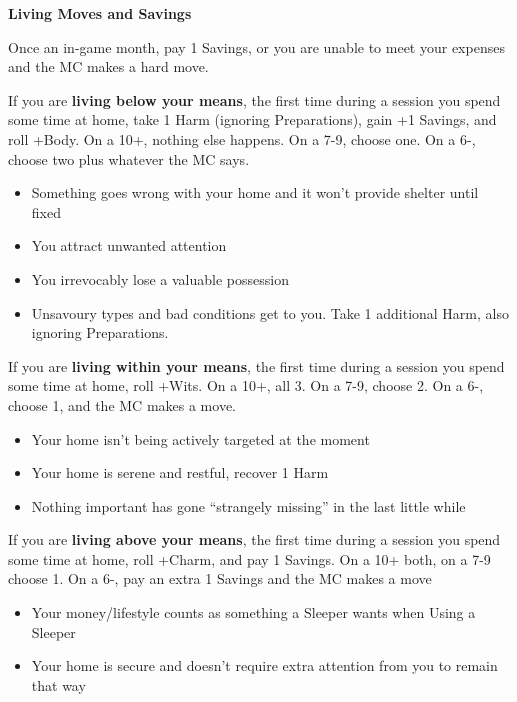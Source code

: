 \documentclass[letterpaper,10pt]{article}
\newenvironment{move}{}{}
\newcommand{\TRIGGER}[1]{\textbf{#1}}
\newcommand{\TITLE}[1]{\begin{center}{\titlefont\Huge\textbf{#1}}\end{center}}
\begin{document}
\TITLE{Living Moves and Savings}

Once an in-game month, pay 1 Savings, or you are unable to meet your
expenses and the MC makes a hard move.

\begin{multicols}{2}

\begin{move}
  If you are \TRIGGER{living below your means}, the first time during
  a session you spend some time at home, take 1 Harm (ignoring
  Preparations), gain +1 Savings, and roll +Body. On a 10+, nothing
  else happens. On a 7-9, choose one. On a 6-, choose two plus
  whatever the MC says.
  \begin{itemize}
  \item Something goes wrong with your home and it won't provide
    shelter until fixed
  \item You attract unwanted attention
  \item You irrevocably lose a valuable possession
  \item Unsavoury types and bad conditions get to you. Take 1
    additional Harm, also ignoring Preparations.
  \end{itemize}
\end{move}

\bigskip

\begin{move}
  If you are \TRIGGER{living within your means}, the first time during
  a session you spend some time at home, roll +Wits. On a 10+, all
  3. On a 7-9, choose 2. On a 6-, choose 1, and the MC makes a move.
  \begin{itemize}
  \item Your home isn't being actively targeted at the moment
  \item Your home is serene and restful, recover 1 Harm
  \item Nothing important has gone ``strangely missing'' in the last
    little while
  \end{itemize}
\end{move}

\bigskip

\begin{move}
  If you are \TRIGGER{living above your means}, the first time during
  a session you spend some time at home, roll +Charm, and pay 1
  Savings. On a 10+ both, on a 7-9 choose 1. On a 6-, pay an extra 1
  Savings and the MC makes a move
  \begin{itemize}
    \item Your money/lifestyle counts as something a Sleeper wants
      when Using a Sleeper
    \item Your home is secure and doesn't require extra attention from
      you to remain that way
  \end{itemize}
\end{move}


\end{multicols}
\end{document}
